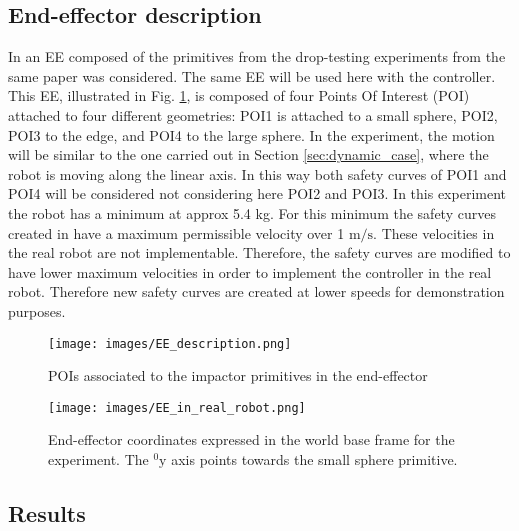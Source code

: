 \subsection{End-effector description}
In \cite{sammi_paper} an EE composed of the primitives from the drop-testing experiments from the same paper was considered. The same EE will be used here with the controller.\\
%
This EE, illustrated in  Fig. \ref{fig:EE_description}, is composed of four Points Of Interest (POI) attached to four different geometries: POI1 is attached to a small sphere, POI2, POI3 to the edge, and POI4 to the large sphere. 
In the experiment, the motion will be similar to the one carried out in Section \ref{sec:dynamic_case}, where the robot is moving along the linear axis. In this way both safety curves of POI1 and POI4 will be considered not considering here POI2 and POI3.
In this experiment the robot has a minimum at approx 5.4 kg. For this minimum the safety curves created in  \cite{sammi_paper} have a maximum permissible velocity over 1 $\mathrm{m/s}$. These velocities in the real robot are not implementable. Therefore, the safety curves are modified to have lower maximum velocities in order to implement the controller in the real robot. Therefore new safety curves are created at lower speeds for demonstration purposes.





\begin{figure}[t!]
	\centerline{
		\texttt{[image: images/EE\_description.png]}}
	\caption{POIs associated to the impactor primitives in the end-effector \cite{sammi_paper}}
	\label{fig:EE_description}
\end{figure}



\begin{figure}[t!]
	\centerline{
		\texttt{[image: images/EE\_in\_real\_robot.png]}}
	\caption{End-effector coordinates expressed in the world base frame for the experiment. The $\mathrm{{}^{0}_{}y}$ axis points towards the small sphere primitive. \cite{sammi_paper}}
	\label{fig:EE_in_real_robot}
\end{figure}





\subsection{Results}

